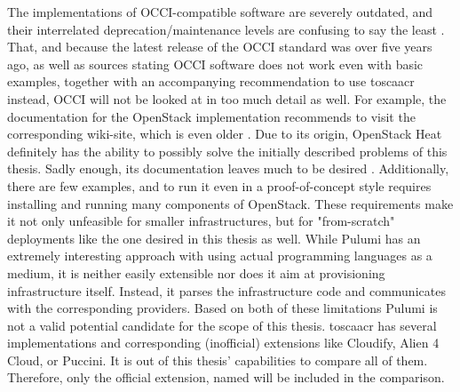 \newline
The implementations of OCCI-compatible software are severely outdated, and their interrelated deprecation/maintenance levels are confusing to say the least \cite{occi_openstack} \cite{occi_opennebula} \cite{github_tmetsch_occi_os} \cite{github_stackforge_occi_os}.
That, and because the latest release of the OCCI standard was over five years ago, as well as sources stating OCCI software does not work even with basic examples, together with an accompanying recommendation to use \gls{toscaacr} instead, %
OCCI will not be looked at in too much detail as well. For example, the documentation for the OpenStack implementation \cite{occi_openstack} recommends to visit the corresponding wiki-site, which is even older \cite{openstack_occi}.
\newline
Due to its origin, OpenStack Heat definitely has the ability to possibly solve the initially described problems of this thesis. Sadly enough, its documentation leaves much to be desired \cite{openstack_heat}. Additionally, there are few examples, and to run it even in a proof-of-concept style requires installing and running many components of OpenStack. These requirements make it not only unfeasible for smaller infrastructures, but for "from-scratch" deployments like the one desired in this thesis as well.
\newline
While Pulumi has an extremely interesting approach with using actual programming languages as a medium, it is neither easily extensible nor does it aim at provisioning infrastructure itself. Instead, it parses the infrastructure code and communicates with the corresponding providers. Based on both of these limitations Pulumi is not a valid potential candidate for the scope of this thesis.
\newline
\Gls{toscaacr} has several implementations and corresponding (inofficial) extensions like Cloudify, Alien 4 Cloud, or Puccini. It is out of this thesis' capabilities to compare all of them. Therefore, only the official extension, named  will be included in the comparison.

